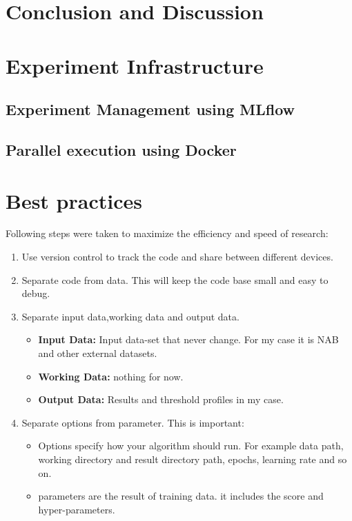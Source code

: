 \documentclass[12pt]{article}
\begin{document}
\section{Conclusion and Discussion}

\section{Experiment Infrastructure}

\subsection{Experiment Management using MLflow}

\subsection{Parallel execution using Docker}

\section{Best practices}
Following steps were taken to maximize the efficiency and speed of research:
\begin{enumerate}
	\item Use version control to track the code and share between different devices.
	\item Separate code from data. This will keep the code base small and easy to debug.
	\item Separate input data,working data and output data.
	\begin{itemize}
		\item \textbf{Input Data:} Input data-set that never change. For my case it is NAB and other external datasets.
		\item \textbf{Working Data:} nothing for now.
		\item \textbf{Output Data:} Results and threshold profiles in my case. 
	\end{itemize}
	\item Separate options from parameter. This is important:
 	\begin{itemize}
 		\item Options specify how your algorithm should run. For example data path, working directory and result directory path, epochs, learning rate and so on.
 		\item parameters are the result of training data. it includes the score and hyper-parameters. 
 	\end{itemize}
	
\end{enumerate}
\end{document}
